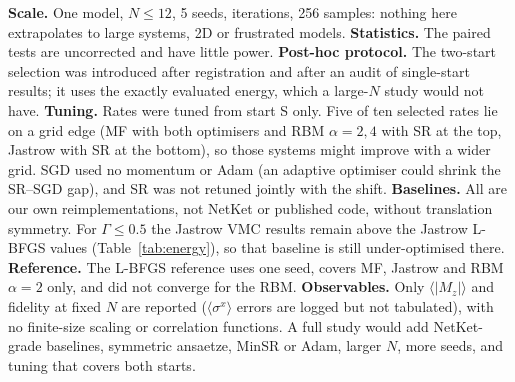 \textbf{Scale.} One model, $N\le12$, 5 seeds,  iterations, 256 samples: nothing here extrapolates to large systems, 2D or frustrated models. \textbf{Statistics.} The paired tests are uncorrected and have little power. \textbf{Post-hoc protocol.} The two-start selection was introduced after registration and after an audit of single-start results; it uses the exactly evaluated energy, which a large-$N$ study would not have. \textbf{Tuning.} Rates were tuned from start S only. Five of ten selected rates lie on a grid edge (MF with both optimisers and RBM $\alpha{=}2,4$ with SR at the top, Jastrow with SR at the bottom), so those systems might improve with a wider grid. SGD used no momentum or Adam (an adaptive optimiser could shrink the SR--SGD gap), and SR was not retuned jointly with the shift. \textbf{Baselines.} All are our own reimplementations, not NetKet or published code, without translation symmetry. For $\Gamma\le0.5$ the Jastrow VMC results remain above the Jastrow L-BFGS values (Table~\ref{tab:energy}), so that baseline is still under-optimised there. \textbf{Reference.} The L-BFGS reference uses one seed, covers MF, Jastrow and RBM $\alpha{=}2$ only, and did not converge for the RBM. \textbf{Observables.} Only $\langle|M_z|\rangle$ and fidelity at fixed $N$ are reported ($\langle\sigma^x\rangle$ errors are logged but not tabulated), with no finite-size scaling or correlation functions. A full study would add NetKet-grade baselines, symmetric ansaetze, MinSR or Adam, larger $N$, more seeds, and tuning that covers both starts.
